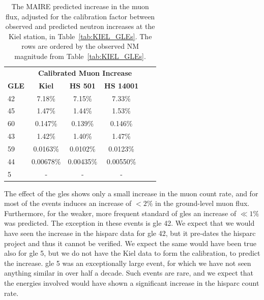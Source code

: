 \begin{table}[ht!]
	\begin{center}
		\caption{The MAIRE predicted increase in the muon flux, adjusted for the calibration factor between observed and predicted neutron increases at the Kiel station, in Table~\ref{tab:KIEL_GLEs}. The rows are ordered by the observed NM magnitude from Table~\ref{tab:KIEL_GLEs}.}
		\label{tab:MAIRE_muons}
		\begin{tabular}{l c c c c c}
			\hline
			&  \multicolumn{3}{c}{\bf Calibrated Muon Increase} \\
			{\bf GLE} & {\bf Kiel} & {\bf HS 501} & {\bf HS 14001} \\
			\hline
			42 & 7.18\%    & 7.15\%    & 7.33\%  \\
			45 & 1.47\%    & 1.44\%    & 1.53\%  \\
			60 & 0.147\%   & 0.139\%   & 0.146\%  \\
			43 & 1.42\%    & 1.40\%    & 1.47\%  \\
			59 & 0.0163\%  & 0.0102\%  & 0.0123\%  \\
			44 & 0.00678\% & 0.00435\% & 0.00550\%  \\
			5 & - & - & - \\
			\hline
		\end{tabular}
	\end{center}
\end{table}



The effect of the \glspl{gle} shows only a small increase in the muon count rate, and for most of the events induces an increase of $< 2 \%$ in the ground-level muon flux. Furthermore, for the weaker, more frequent standard of \glspl{gle} an increase of $\ll 1\%$ was predicted. The exception in these events is \gls{gle} 42. We expect that we would have seen the increase in the \gls{hisparc} data for \gls{gle} 42, but it pre-dates the \gls{hisparc} project and thus it cannot be verified. We expect the same would have been true also for \gls{gle} 5, but we do not have the Kiel data to form the calibration, to predict the increase. \gls{gle} 5 was an exceptionally large event, for which we have not seen anything similar in over half a decade. Such events are rare, and we expect that the energies involved would have shown a significant increase in the \gls{hisparc} count rate.

